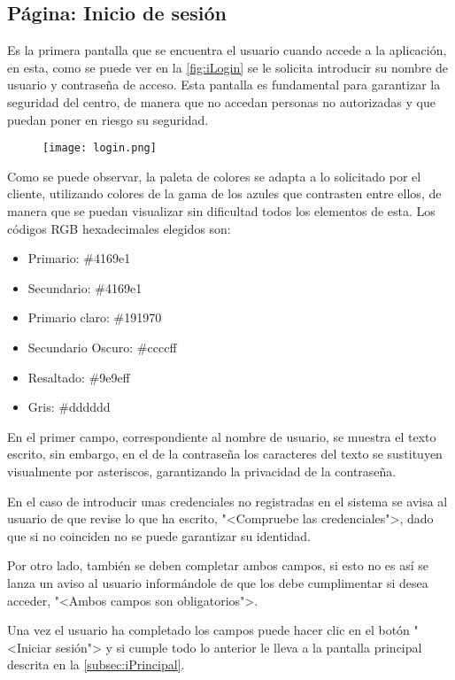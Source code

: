 \subsection{Página: Inicio de sesión}\label{subsec:iLogin}
Es la primera pantalla que se encuentra el usuario cuando accede a la aplicación, en esta, como se puede ver en la \autoref{fig:iLogin} se le solicita introducir su nombre de usuario y contraseña de acceso. Esta pantalla es fundamental para garantizar la seguridad del centro, de manera que no accedan personas no autorizadas y que puedan poner en riesgo su seguridad.
\begin{figure}[H]
	{\texttt{[image: login.png]}}
\end{figure}
Como se puede observar, la paleta de colores se adapta a lo solicitado por el cliente, utilizando colores de la gama de los azules que contrasten entre ellos, de manera que se puedan visualizar sin dificultad todos los elementos de esta. Los códigos RGB hexadecimales elegidos son:
\begin{itemize}
	\item Primario: \#4169e1
	\item Secundario: \#4169e1
	\item Primario claro: \#191970
	\item Secundario Oscuro: \#ccccff
	\item Resaltado: \#9e9eff
	\item Gris: \#dddddd
\end{itemize}
En el primer campo, correspondiente al nombre de usuario, se muestra el texto escrito, sin embargo, en el de la contraseña los caracteres del texto se sustituyen visualmente por asteriscos, garantizando la privacidad de la contraseña.

En el caso de introducir unas credenciales no registradas en el sistema se avisa al usuario de que revise lo que ha escrito, "<Compruebe las credenciales">, dado que si no coinciden no se puede garantizar su identidad.

Por otro lado, también se deben completar ambos campos, si esto no es así se lanza un aviso al usuario informándole de que los debe cumplimentar si desea acceder, "<Ambos campos son obligatorios">.

Una vez el usuario ha completado los campos puede hacer clic en el botón "<Iniciar sesión"> y si cumple todo lo anterior le lleva a la pantalla principal descrita en la \autoref{subsec:iPrincipal}.

